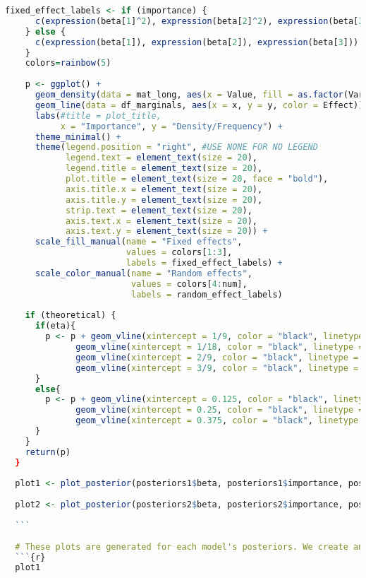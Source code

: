 \begin{lstlisting}[language=R, caption=Usage of the Bayesian Importance package with plots and examples.]
    fixed_effect_labels <- if (importance) {
      c(expression(beta[1]^2), expression(beta[2]^2), expression(beta[3]^2))
    } else {
      c(expression(beta[1]), expression(beta[2]), expression(beta[3]))
    }
    colors=rainbow(5)
    
    p <- ggplot() +
      geom_density(data = mat_long, aes(x = Value, fill = as.factor(Variable)), alpha = 0.5) +
      geom_line(data = df_marginals, aes(x = x, y = y, color = Effect)) +
      labs(#title = plot_title, 
           x = "Importance", y = "Density/Frequency") +
      theme_minimal() +
      theme(legend.position = "right", #USE NONE FOR NO LEGEND
            legend.text = element_text(size = 20),
            legend.title = element_text(size = 20),
            plot.title = element_text(size = 20, face = "bold"),
            axis.title.x = element_text(size = 20),
            axis.title.y = element_text(size = 20),
            strip.text = element_text(size = 20),
            axis.text.x = element_text(size = 20),
            axis.text.y = element_text(size = 20)) +
      scale_fill_manual(name = "Fixed effects", 
                        values = colors[1:3], 
                        labels = fixed_effect_labels) +
      scale_color_manual(name = "Random effects", 
                         values = colors[4:num], 
                         labels = random_effect_labels)
      
    if (theoretical) {
      if(eta){
        p <- p + geom_vline(xintercept = 1/9, color = "black", linetype = "dashed") +
              geom_vline(xintercept = 1/18, color = "black", linetype = "dashed") +
              geom_vline(xintercept = 2/9, color = "black", linetype = "dashed") +
              geom_vline(xintercept = 3/9, color = "black", linetype = "dashed")
      }
      else{
        p <- p + geom_vline(xintercept = 0.125, color = "black", linetype = "dashed") +
              geom_vline(xintercept = 0.25, color = "black", linetype = "dashed") +
              geom_vline(xintercept = 0.375, color = "black", linetype = "dashed")
      }
    }
    return(p)
  }
  
  plot1 <- plot_posterior(posteriors1$beta, posteriors1$importance, posteriors1$marginals, importance = TRUE)
  
  plot2 <- plot_posterior(posteriors2$beta, posteriors2$importance, posteriors2$marginals, importance = TRUE, eta=TRUE)
  
  ```
  
  # These plots are generated for each model's posteriors. We create and store the plots in variables plot1, plot2, plot3, and plot4 for the respective models.
  ```{r}
  plot1
  

\end{lstlisting}
